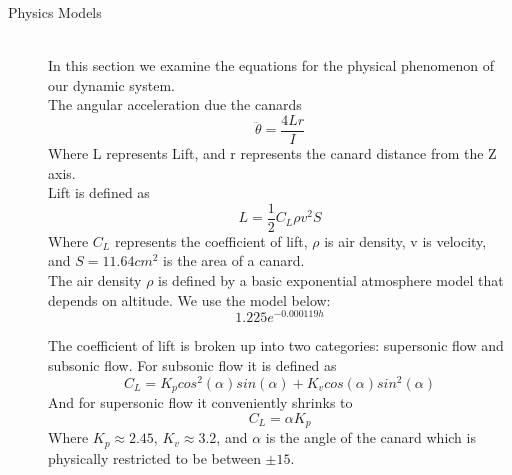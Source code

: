 \documentclass[12pt]{article}
\begin{document}
\begin{description}
	\item[Physics Models] \hfill \\
	In this section we examine the equations for the physical phenomenon of our dynamic system.\\
	
	The angular acceleration due the canards
	\begin{equation}
		\ddot{\theta} = \frac{4Lr}{I}
	\end{equation}
	Where L represents Lift, and r represents the canard distance from the Z axis.\\
	
	Lift is defined as
	\begin{equation}
		L = \frac{1}{2}C_{L}\rho v^2 S
	\end{equation}
	Where $C_{L}$ represents the coefficient of lift, $\rho$ is air density, v is velocity, and $S = 11.64cm^2$ is the area of a canard.\\
	
	The air density $\rho$ is defined by a basic exponential atmosphere model that depends on altitude. We use the model below:
	\begin{equation}
		1.225e^{-0.000119h}
	\end{equation}
	
	The coefficient of lift is broken up into two categories: supersonic flow and subsonic flow. For subsonic flow it is defined as
	\begin{equation}
		C_{L} = K_{p} cos^2(\alpha) sin(\alpha) + K_{v} cos(\alpha) sin^2(\alpha)
	\end{equation}
	And for supersonic flow it conveniently shrinks to
	\begin{equation}
		C_{L} = \alpha K_{p}
	\end{equation}
	Where $K_{p} \approx 2.45$, $K_{v} \approx 3.2$, and $\alpha$ is the angle of the canard which is physically restricted to be between $\pm15$\textdegree.
	
\end{description}
 
\end{document}
